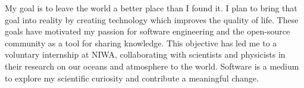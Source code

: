 \documentclass[9pt]{developercv}
\begin{document}

My goal is to leave the world a better place than I found it. I plan to bring that goal into reality by creating technology which improves the quality of life. These goals have motivated my passion for software engineering and the open-source community as a tool for sharing knowledge. This objective has led me to a voluntary internship at NIWA, collaborating with scientists and physicists in their research on our oceans and atmosphere to the world. Software is a medium to explore my scientific curiosity and contribute a meaningful change.


\end{document}
